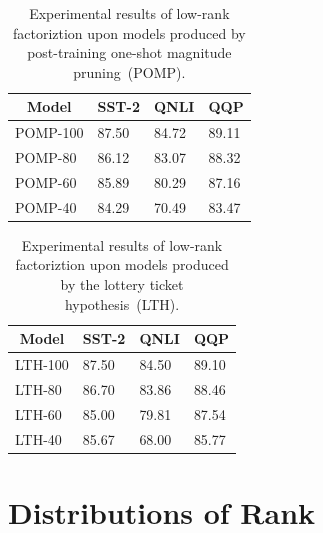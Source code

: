 	\begin{table}[h!]
		\centering
		\footnotesize
		\begin{tabular}{l|l|lll}
			\toprule
			\multicolumn{2}{c|}{Model}                          & SST-2       & QNLI          & QQP           \\
			\midrule
			\multicolumn{2}{l|}{POMP-100}  &87.50       & 84.72     &89.11        \\
			\multicolumn{2}{l|}{POMP-80}  &86.12       &83.07      &88.32        \\
			\multicolumn{2}{l|}{POMP-60}  &85.89       &80.29      &87.16        \\
			\multicolumn{2}{l|}{POMP-40}  &84.29       &70.49      &83.47        \\
			\bottomrule
		\end{tabular}
		\caption{Experimental results of low-rank factoriztion upon models produced by post-training one-shot magnitude pruning~(POMP).}
		\label{table:pomp}
	\end{table}
	
	\begin{table}[h!]
		\centering
		\footnotesize
		\begin{tabular}{l|l|lll}
			\toprule
			\multicolumn{2}{c|}{Model}                          & SST-2       & QNLI          & QQP           \\
			\midrule
			\multicolumn{2}{l|}{LTH-100}  &87.50       &84.50      &89.10        \\
			\multicolumn{2}{l|}{LTH-80}  &86.70       &83.86      &88.46        \\
			\multicolumn{2}{l|}{LTH-60}  &85.00       &79.81      &87.54        \\
			\multicolumn{2}{l|}{LTH-40}  &85.67       &68.00      &85.77        \\
			\bottomrule
		\end{tabular}
		\caption{Experimental results of low-rank factoriztion upon models produced by the lottery ticket hypothesis~(LTH).}
		\label{table:lth}
	\end{table}
	
	\section{Distributions of Rank}
	\label{sec:appendixA}
	
